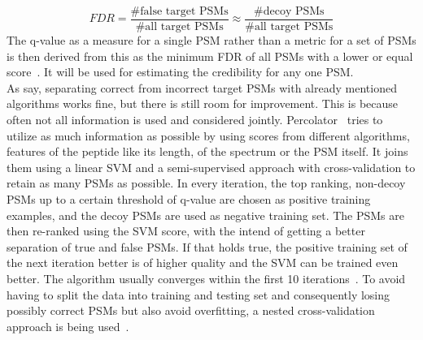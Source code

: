 	\begin{equation}
	FDR = \frac{\text{\# false target PSMs}}{\text{\# all target PSMs}} \approx  \frac{\text{\# decoy PSMs}}{\text{\# all target PSMs}}
	\end{equation}
	The q-value as a measure for a single PSM rather than a metric for a set of PSMs is then derived from this as the minimum FDR of all PSMs with a lower or equal score~\cite{Granholm2012, Aggarwal2016}. It will be used for estimating the credibility for any one PSM.\\
	As \citet{Kll2007} say, separating correct from incorrect target PSMs with already mentioned algorithms works fine, but there is still room for improvement. This is because often not all information is used and considered jointly. Percolator~\cite{Kll2007, Granholm2012} tries to utilize as much information as possible by using scores from different algorithms, features of the peptide like its length, of the spectrum or the PSM itself. It joins them using a linear SVM and a semi-supervised approach with cross-validation to retain as many PSMs as possible. In every iteration, the top ranking, non-decoy PSMs up to a certain threshold of q-value are chosen as positive training examples, and the decoy PSMs are used as negative training set. The PSMs are then re-ranked using the SVM score, with the intend of getting a better separation of true and false PSMs. If that holds true, the positive training set of the next iteration better is of higher quality and the SVM can be trained even better. The algorithm usually converges within the first 10 iterations~\cite{Kll2007}. To avoid having to split the data into training and testing set and consequently losing possibly correct PSMs but also avoid overfitting, a nested cross-validation approach is being used~\cite{Granholm2012}.


